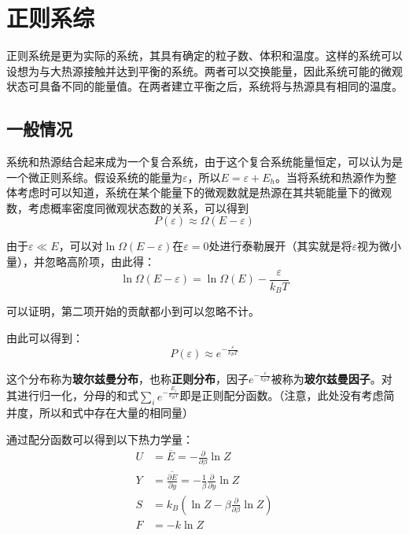 \documentclass[UTF8]{ctexart}
\begin{document}
	\section{正则系综}
	正则系统是更为实际的系统，其具有确定的粒子数、体积和温度。这样的系统可以设想为与大热源接触并达到平衡的系统。两者可以交换能量，因此系统可能的微观状态可具备不同的能量值。在两者建立平衡之后，系统将与热源具有相同的温度。
	
	\subsection{一般情况}
	系统和热源结合起来成为一个复合系统，由于这个复合系统能量恒定，可以认为是一个微正则系综。假设系统的能量为$ \varepsilon $，所以$ E=\varepsilon+E_{h} $。当将系统和热源作为整体考虑时可以知道，系统在某个能量下的微观数就是热源在其共轭能量下的微观数，考虑概率密度同微观状态数的关系，可以得到
	\begin{equation}
		P(\varepsilon) \approx \Omega(E-\varepsilon)
	\end{equation}
	
	由于$ \varepsilon \ll E $，可以对$ \ln \Omega(E-\varepsilon) $在$ \varepsilon=0 $处进行泰勒展开（其实就是将$ \varepsilon $视为微小量），并忽略高阶项，由此得：
	\begin{equation}
		\ln \Omega(E-\varepsilon)= \ln \Omega(E)-\frac{\varepsilon}{k_{B} T}
	\end{equation}
	
\noindent 可以证明，第二项开始的贡献都小到可以忽略不计。

	由此可以得到：
	\begin{equation}
		P(\varepsilon) \approx e^{-\frac{\varepsilon}{k_{B} T}}
	\end{equation}
	
\noindent 这个分布称为\textbf{玻尔兹曼分布}，也称\textbf{正则分布}，因子$ e^{-\frac{\varepsilon}{k_{B} T}} $被称为\textbf{玻尔兹曼因子}。对其进行归一化，分母的和式$ \sum_{i}  e^{-\frac{E_{i}}{k_{B} T}}$即是正则配分函数。（注意，此处没有考虑简并度，所以和式中存在大量的相同量）
		
		通过配分函数可以得到以下热力学量：
		\begin{equation}
		\begin{aligned}
			U&=\overline{E}=-\frac{\partial}{\partial \beta} \ln Z\\
			Y&=\overline{\frac{\partial E}{\partial y}}=- \frac{1}{\beta} \frac{\partial}{\partial y} \ln Z\\
			S&=k_{B} \left(\ln Z-\beta \frac{\partial}{\partial \beta} \ln Z\right)\\
			F&=-k \ln Z
		\end{aligned}
		\end{equation}
		
\end{document}
